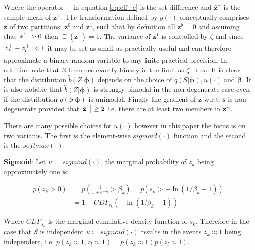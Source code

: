 \documentclass[final,1p,times]{elsarticle}
\DeclareMathOperator*{\E}{\mathbb{E}}
\begin{document}
Where the operator $-$ in equation \eqref{eq:eff_c} is the set difference and $\bar{\mathbf{z}}^+$ is the sample mean of $\mathbf{z}^+$. The transformation defined by $g(\cdot)$ conceptually comprises $\mathbf{z}$ of two partitions: $\mathbf{z}^0$ and $\mathbf{z}^1$, such that by definition all $\mathbf{z}^0 = 0$ and assuming that $\abs{\mathbf{z}^1} > 0$ then $\E ( \mathbf{z}^1 ) = 1$. The variance of $\mathbf{z}^1$ is controlled by $\zeta$ and since $ \abs{z_k^+ - z_l^+} < 1 $ it may be set as small as practically useful and can therefore approximate a binary random variable to any finite practical precision. In addition note that $Z$ becomes exactly binary in the limit as $\zeta \rightarrow \infty$.  It is clear that the distribution $\tilde{b}(Z|\boldsymbol{\phi})$ depends on the choice of $q(S|\boldsymbol{\phi}), u(\cdot)$ and $\boldsymbol{\beta}$. It is also notable that $\tilde{b}(Z|\boldsymbol{\phi})$ is strongly bimodal in the non-degenerate case even if the distribution $q(S|\boldsymbol{\phi})$ is unimodal. Finally the gradient of $\mathbf{z}$ w.r.t. $\mathbf{s}$ is non-degenerate provided that $\abs{\mathbf{z}^1} \geq 2$ i.e. there are at least two members in $\mathbf{z}^+$. \newline

There are many possible choices for $u(\cdot)$ however in this paper the focus is on two variants. The first is the element-wise $sigmoid(\cdot)$ function and the second is the $softmax(\cdot)$. \newline

\textbf{Sigmoid}: Let $u \coloneqq sigmoid(\cdot)$, the marginal probability of $z_k$ being approximately one is:

\begin{align}
p \left(z_k > 0 \right) & = p \left(\frac{1}{1+e^{-s_k}} > \beta_k \right) = p \left( s_k > - \ln {\left( 1 / \beta_k - 1 \right) } \right) \label{eq:p_enabled_z_expect_a_sigmoid} \\
& = 1 - CDF_{s_k} \left( - \ln {\left( 1 / \beta_k - 1 \right) } \right) \label{eq:p_enabled_z_expect_b_sigmoid}
\end{align}

Where $CDF_{s_k}$ is the marginal cumulative density function of $s_k$. Therefore in the case that $S$ is independent $u \coloneqq sigmoid(\cdot)$ results in the events $z_k \approx 1$ being independent, i.e. $p \left( z_k \approx 1, z_l \approx 1 \right) = p \left( z_k \approx 1 \right) p \left( z_l \approx 1 \right)$. \newline
\end{document}
